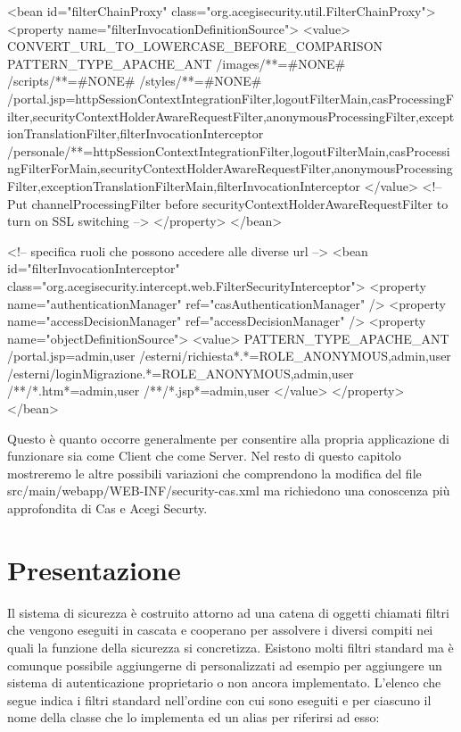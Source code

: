\begin{xml}
  <bean id="filterChainProxy" class="org.acegisecurity.util.FilterChainProxy">
    <property name="filterInvocationDefinitionSource">
      <value>
        CONVERT_URL_TO_LOWERCASE_BEFORE_COMPARISON
        PATTERN_TYPE_APACHE_ANT 
        /images/**=#NONE#
        /scripts/**=#NONE# 
        /styles/**=#NONE#
        /portal.jsp=httpSessionContextIntegrationFilter,logoutFilterMain,casProcessingFilter,securityContextHolderAwareRequestFilter,anonymousProcessingFilter,exceptionTranslationFilter,filterInvocationInterceptor
        /personale/**=httpSessionContextIntegrationFilter,logoutFilterMain,casProcessingFilterForMain,securityContextHolderAwareRequestFilter,anonymousProcessingFilter,exceptionTranslationFilterMain,filterInvocationInterceptor
      </value>
      <!--
        Put channelProcessingFilter before
        securityContextHolderAwareRequestFilter to turn on SSL switching
      -->
    </property>
  </bean>
  
  <!-- specifica ruoli che possono accedere alle diverse url  -->
  <bean id="filterInvocationInterceptor"
    class="org.acegisecurity.intercept.web.FilterSecurityInterceptor">
    <property name="authenticationManager" ref="casAuthenticationManager" />
    <property name="accessDecisionManager" ref="accessDecisionManager" />
    <property name="objectDefinitionSource">
      <value>
        PATTERN_TYPE_APACHE_ANT
        /portal.jsp=admin,user
        /esterni/richiesta*.*=ROLE_ANONYMOUS,admin,user
        /esterni/loginMigrazione.*=ROLE_ANONYMOUS,admin,user
        /**/*.htm*=admin,user
        /**/*.jsp*=admin,user
      </value>
    </property>
  </bean>

\end{xml}

Questo è quanto occorre generalmente per consentire alla propria applicazione di funzionare sia come Client che come Server. Nel resto di questo capitolo mostreremo le altre possibili variazioni che comprendono la modifica del file  src/main/webapp/WEB-INF/security-cas.xml ma richiedono una conoscenza più approfondita di Cas e Acegi Securty.


\section{Presentazione}

Il sistema di sicurezza è costruito attorno ad una catena di oggetti chiamati filtri che vengono eseguiti in cascata e cooperano per assolvere i diversi compiti nei quali la funzione della sicurezza si concretizza. Esistono molti filtri standard ma è comunque possibile aggiungerne di personalizzati ad esempio per aggiungere un sistema di autenticazione proprietario o non ancora implementato. L'elenco che segue indica i filtri standard nell'ordine con cui sono eseguiti e per ciascuno il nome della classe che lo implementa ed  un alias per riferirsi ad esso:


